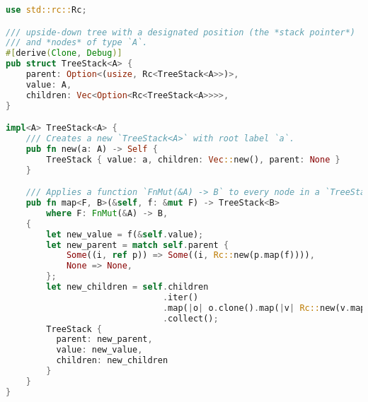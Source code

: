 \documentclass[11pt,a4paper,sans]{assingment}
\begin{document}
\begin{lstlisting}[language=rust]
use std::rc::Rc;

/// upside-down tree with a designated position (the *stack pointer*)
/// and *nodes* of type `A`.
#[derive(Clone, Debug)]
pub struct TreeStack<A> {
    parent: Option<(usize, Rc<TreeStack<A>>)>,
    value: A,
    children: Vec<Option<Rc<TreeStack<A>>>>,
}

impl<A> TreeStack<A> {
    /// Creates a new `TreeStack<A>` with root label `a`.
    pub fn new(a: A) -> Self {
        TreeStack { value: a, children: Vec::new(), parent: None }
    }

    /// Applies a function `FnMut(&A) -> B` to every node in a `TreeStack<A>`.
    pub fn map<F, B>(&self, f: &mut F) -> TreeStack<B>
        where F: FnMut(&A) -> B,
    {
        let new_value = f(&self.value);
        let new_parent = match self.parent {
            Some((i, ref p)) => Some((i, Rc::new(p.map(f)))),
            None => None,
        };
        let new_children = self.children
                               .iter()
                               .map(|o| o.clone().map(|v| Rc::new(v.map(f))))
                               .collect();
        TreeStack {
          parent: new_parent,
          value: new_value,
          children: new_children
        }
    }
}
\end{lstlisting}
\end{document}
